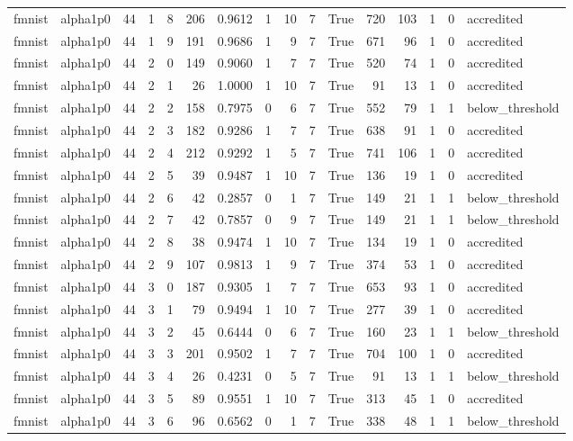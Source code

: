 \begin{tabular}{llrrrrrrrrrrrrrl}
fmnist & alpha1p0 & 44 & 1 & 8 & 206 & 0.9612 & 1 & 10 & 7 & True & 720 & 103 & 1 & 0 & accredited \\
fmnist & alpha1p0 & 44 & 1 & 9 & 191 & 0.9686 & 1 & 9 & 7 & True & 671 & 96 & 1 & 0 & accredited \\
fmnist & alpha1p0 & 44 & 2 & 0 & 149 & 0.9060 & 1 & 7 & 7 & True & 520 & 74 & 1 & 0 & accredited \\
fmnist & alpha1p0 & 44 & 2 & 1 & 26 & 1.0000 & 1 & 10 & 7 & True & 91 & 13 & 1 & 0 & accredited \\
fmnist & alpha1p0 & 44 & 2 & 2 & 158 & 0.7975 & 0 & 6 & 7 & True & 552 & 79 & 1 & 1 & below\_threshold \\
fmnist & alpha1p0 & 44 & 2 & 3 & 182 & 0.9286 & 1 & 7 & 7 & True & 638 & 91 & 1 & 0 & accredited \\
fmnist & alpha1p0 & 44 & 2 & 4 & 212 & 0.9292 & 1 & 5 & 7 & True & 741 & 106 & 1 & 0 & accredited \\
fmnist & alpha1p0 & 44 & 2 & 5 & 39 & 0.9487 & 1 & 10 & 7 & True & 136 & 19 & 1 & 0 & accredited \\
fmnist & alpha1p0 & 44 & 2 & 6 & 42 & 0.2857 & 0 & 1 & 7 & True & 149 & 21 & 1 & 1 & below\_threshold \\
fmnist & alpha1p0 & 44 & 2 & 7 & 42 & 0.7857 & 0 & 9 & 7 & True & 149 & 21 & 1 & 1 & below\_threshold \\
fmnist & alpha1p0 & 44 & 2 & 8 & 38 & 0.9474 & 1 & 10 & 7 & True & 134 & 19 & 1 & 0 & accredited \\
fmnist & alpha1p0 & 44 & 2 & 9 & 107 & 0.9813 & 1 & 9 & 7 & True & 374 & 53 & 1 & 0 & accredited \\
fmnist & alpha1p0 & 44 & 3 & 0 & 187 & 0.9305 & 1 & 7 & 7 & True & 653 & 93 & 1 & 0 & accredited \\
fmnist & alpha1p0 & 44 & 3 & 1 & 79 & 0.9494 & 1 & 10 & 7 & True & 277 & 39 & 1 & 0 & accredited \\
fmnist & alpha1p0 & 44 & 3 & 2 & 45 & 0.6444 & 0 & 6 & 7 & True & 160 & 23 & 1 & 1 & below\_threshold \\
fmnist & alpha1p0 & 44 & 3 & 3 & 201 & 0.9502 & 1 & 7 & 7 & True & 704 & 100 & 1 & 0 & accredited \\
fmnist & alpha1p0 & 44 & 3 & 4 & 26 & 0.4231 & 0 & 5 & 7 & True & 91 & 13 & 1 & 1 & below\_threshold \\
fmnist & alpha1p0 & 44 & 3 & 5 & 89 & 0.9551 & 1 & 10 & 7 & True & 313 & 45 & 1 & 0 & accredited \\
fmnist & alpha1p0 & 44 & 3 & 6 & 96 & 0.6562 & 0 & 1 & 7 & True & 338 & 48 & 1 & 1 & below\_threshold \\

\end{tabular}
